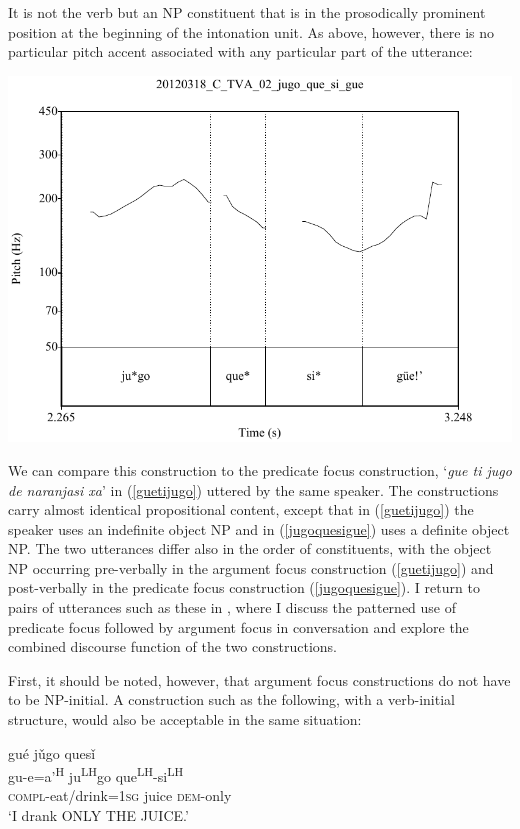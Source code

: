 It is not the verb but an NP constituent that is in the prosodically prominent position at the beginning of the intonation unit. As above, however, there is no particular pitch accent associated with any particular part of the utterance:

\vspace{3mm}

\includegraphics[height=.4\textheight]{jugoquesigue}

We can compare this construction to the predicate focus construction, `\textit{gue ti jugo de naranjasi xa}' in (\ref{guetijugo}) uttered by the same speaker. The constructions carry almost identical propositional content, except that in (\ref{guetijugo}) the speaker uses an indefinite object NP and in (\ref{jugoquesigue}) uses a definite object NP. The two utterances differ also in the order of constituents, with the object NP occurring pre-verbally in the argument focus construction (\ref{guetijugo}) and post-verbally in the predicate focus construction (\ref{jugoquesigue}). I return to pairs of utterances such as these in , where I discuss the patterned use of predicate focus followed by argument focus in conversation and explore the combined discourse function of the two constructions. 

First, it should be noted, however, that argument focus constructions do not have to be NP-initial. A construction such as the following, with a verb-initial structure, would also be acceptable in the same situation:

\ea
\glll gu\'{e} j\v{u}go ques\v{i}  \\
gu-e=a'\textsuperscript{H} ju\textsuperscript{LH}go que\textsuperscript{LH}-si\textsuperscript{LH}  \\
\textsc{compl}-eat/drink=\textsc{1sg} juice \textsc{dem}-only  \\
\glt `I drank ONLY THE JUICE.'  

